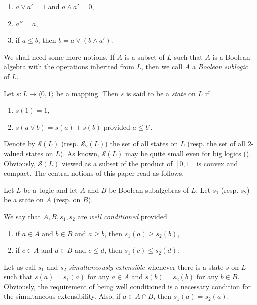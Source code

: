 \documentclass{article}
\begin{document}
{\begin{definition}
\begin{enumerate}
\item[(ii)] $a\vee a'=1$ and $a\wedge a'=0$,

\item[(iii)] $a''=a$,

\item[(iv)] if $a\leq b$, then
$
b=a\vee (b\wedge a').
$
\end{enumerate}
\end{definition} \bigskip

We shall need some more notions. If $A$ is a subset of $L$ such that
$A$ is a Boolean algebra with the
operations inherited from $L$,
then we call $A$ a \textit{Boolean sublogic} of $L$.

Let $s:L\to\langle 0,1\rangle$ be a mapping. Then $s$ is said to be a \textit{state} on $L$ if

\begin{enumerate}
\item $s(1)=1$,

\item $s(a\vee b)=s(a)+s(b)$ provided
      $a\leq b'$.
\end{enumerate}

Denote by $\mathcal{S}(L)$ (resp. $\mathcal{S}_2(L)$)  the set of all
states on $L$ (resp. the set of all $2$-valued states on $L$). As known, $\mathcal{S}(L)$ may be
quite small even for big logics (\cite{Greechie}).
Obviously, $\mathcal{S}(L)$ viewed as a subset of the product of $[0,1]$ is convex and compact.
The central notions of this paper
read as follows.

\begin{definition}

Let $L$ be a~logic and let $A$ and $B$
be Boolean subalgebras of $L$. Let
$s_1$ (resp. $s_2$) be a state on $A$
(resp. on $B$).

We say that $A,B,s_1,s_2$ are \textit{well conditioned} provided

\begin{enumerate}
\item if $a\in A$ and $b\in B$ and $a\ge b$,
      then $s_1(a)\ge s_2(b)$,

\item if $c\in A$ and $d\in B$ and $c\le d$,
      then $s_1(c)\le s_2(d)$.
\end{enumerate}
\end{definition}

Let us call $s_1$ and $s_2$ \textit{simultaneously
extensible} whenever there is a state $s$
on $L$ such that $s(a)=s_1(a)$ for any $a \in A$  and $s(b)=s_2(b)$ for any $b \in B$. Obviously, the requirement of being
well conditioned is a necessary condition
for the simultaneous extensibility. Also, if $a \in A \cap B$, then $s_1(a)=s_2(a)$.

}
\end{document}
